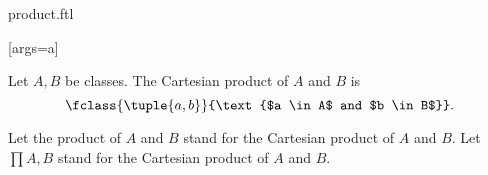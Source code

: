 \documentclass{article}
\begin{document}
\begin{smodule}[creators={Marcel Schütz}]{product.ftl}

  [args=a]{}

  \begin{fdefinition*}[label=1589561467600896]
    Let $A, B$ be classes.
    The Cartesian product of $A$ and $B$ is
    \[\fclass{\tuple{a,b}}{\text{$a \in A$ and $b \in B$}}.\]

    Let the product of $A$ and $B$ stand for the Cartesian product of $A$ and $B$.
    Let $\prod{A,B}$ stand for the Cartesian product of $A$ and $B$.
  \end{fdefinition*}
\end{smodule}
\end{document}
